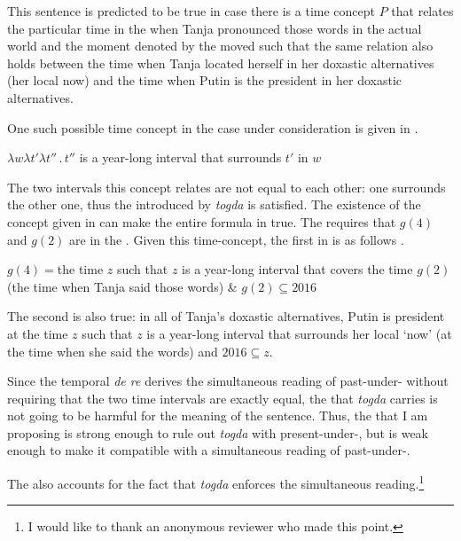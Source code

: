 \documentclass[output=paper,modfonts,newtxmath,hidelinks]{langscibook}
\begin{document}
\noindent This sentence is predicted to be true in case there is a time concept $P$ that relates the particular time in the  when Tanja pronounced those words in the actual world and the  moment denoted by the moved  such that the same relation also holds between the time when Tanja located herself in her doxastic alternatives (her local now) and the time when Putin is the president in her doxastic alternatives.

One such possible time concept in the case under consideration is given in .

\ea $\lambda w\lambda t'\lambda t''\,.\,t''$ is a year-long interval that surrounds $t'$ in $w$\label{20:ex41}
\z

\noindent The two intervals this concept relates are not equal to each other: one surrounds the other one, thus the  introduced by \textit{togda} is satisfied. The existence of the concept given in  can make the entire formula in  true. The  requires that $g(4)$ and $g(2)$ are in the . Given this time-concept, the first  in  is as follows .

\ea $g(4)={}$the time $z$ such that $z$ is a year-long interval that covers
\glt \hspace{0.5cm}the time $g(2)$ (the time when Tanja said those words) \& $g(2)\subseteq 2016$\label{20:ex42}
\z

\noindent The second  is also true: in all of Tanja’s doxastic alternatives, Putin is president at the time $z$ such that $z$ is a year-long interval that surrounds her local `now' (at the time when she said the words) and $2016\subseteq z$.

Since the temporal \textit{de re}  derives the simultaneous reading of past-under- without requiring that the two time intervals are exactly equal, the  that \textit{togda} carries is not going to be harmful for the meaning of the sentence. Thus, the  that I am proposing is strong enough to rule out \textit{togda} with present-under-, but is weak enough to make it compatible with a simultaneous reading of past-under-.

The   also accounts for the fact that \textit{togda} enforces the simultaneous reading.\footnote{\label{20:fn12}I would like to thank an anonymous reviewer who made this point.}
\end{document}
